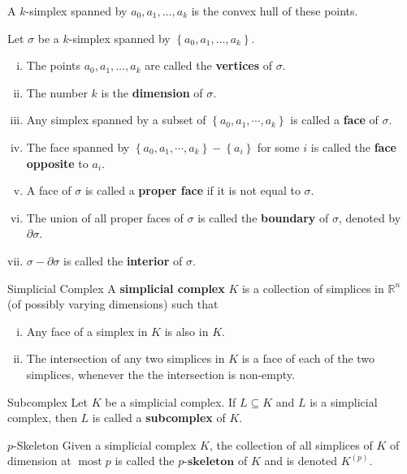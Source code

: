 \documentclass{report}
\begin{document}
\noindent A $k$-simplex spanned by $a_0, a_1, \ldots, a_k$ is the convex hull of these points.
\begin{definition}{}{}
Let $\sigma$ be a $k$-simplex spanned by $\left\{a_0, a_1, \ldots, a_k\right\}$.
\begin{enumerate}[(i)] 
	\item The points $a_0, a_1, \ldots, a_k$ are called the \textbf{vertices} of $\sigma$.
	\item The number $k$ is the \textbf{dimension} of $\sigma$.
	\item Any simplex spanned by a subset of $\left\{a_0, a_1, \cdots, a_k\right\}$ is called a \textbf{face} of $\sigma$. 
	\item The face spanned by $\left\{a_0, a_1, \cdots, a_k\right\}-\left\{a_i\right\}$ for some $i$ is called the \textbf{face opposite} to $a_i$.
	\item A face of $\sigma$ is called a \textbf{proper face} if it is not equal to $\sigma$.
	\item The union of all proper faces of $\sigma$ is called the \textbf{boundary} of $\sigma$, denoted by $\partial \sigma$.
	\item $\sigma-\partial \sigma$ is called the \textbf{interior} of $\sigma$.
\end{enumerate}
\end{definition}

\begin{definition}{Simplicial Complex}{}
A \textbf{simplicial complex} $K$ is a collection of simplices in $\mathbb{R}^n$ (of possibly varying dimensions) such that
\begin{enumerate}[(i)] 
	\item Any face of a simplex in $K$ is also in $K$.
	\item The intersection of any two simplices in $K$ is a face of each of the two simplices, whenever the the intersection is non-empty.
\end{enumerate}
\end{definition}


\begin{definition}{Subcomplex}{}
Let $K$ be a simplicial complex. If $L\subseteq K$ and $L$ is a simplicial complex, then $L$ is called a \textbf{subcomplex} of $K$.
\end{definition}


\begin{definition}{$p$-Skeleton}{}
Given a simplicial complex $K$, the collection of all simplices of $K$ of dimension at $\operatorname{most} p$ is called the $\textbf{$p$-skeleton}$ of $K$ and is denoted $K^{(p)}$.
\end{definition}
\end{document}
